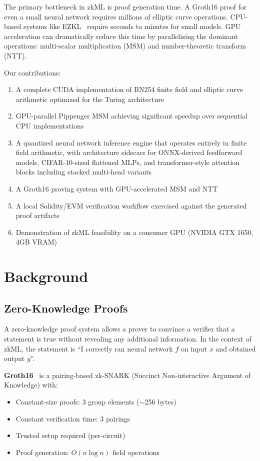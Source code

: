 \documentclass[11pt,a4paper]{article}
\begin{document}
The primary bottleneck in zkML is proof generation time. A Groth16
proof for even a small neural network requires millions of elliptic
curve operations. CPU-based systems like EZKL~\cite{ezkl} require
seconds to minutes for small models. GPU acceleration can dramatically
reduce this time by parallelizing the dominant operations:
multi-scalar multiplication (MSM) and number-theoretic transform (NTT).

Our contributions:
\begin{enumerate}
  \item A complete CUDA implementation of BN254 finite field and
    elliptic curve arithmetic optimized for the Turing architecture
  \item GPU-parallel Pippenger MSM achieving significant speedup
    over sequential CPU implementations
  \item A quantized neural network inference engine that operates
    entirely in finite field arithmetic, with architecture sidecars for
    ONNX-derived feedforward models, CIFAR-10-sized flattened MLPs,
    and transformer-style attention blocks including stacked multi-head variants
  \item A Groth16 proving system with GPU-accelerated MSM and NTT
  \item A local Solidity/EVM verification workflow exercised against the
    generated proof artifacts
  \item Demonstration of zkML feasibility on a consumer GPU
    (NVIDIA GTX 1650, 4GB VRAM)
\end{enumerate}

\section{Background}

\subsection{Zero-Knowledge Proofs}

A zero-knowledge proof system allows a prover to convince a verifier
that a statement is true without revealing any additional information.
In the context of zkML, the statement is ``I correctly ran neural
network $f$ on input $x$ and obtained output $y$''.

\textbf{Groth16}~\cite{groth16} is a pairing-based zk-SNARK
(Succinct Non-interactive Argument of Knowledge) with:
\begin{itemize}
  \item Constant-size proofs: 3 group elements ($\sim$256 bytes)
  \item Constant verification time: 3 pairings
  \item Trusted setup required (per-circuit)
  \item Proof generation: $O(n \log n)$ field operations
\end{itemize}
\end{document}
